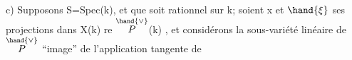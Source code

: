 c) Supposons S=Spec(k), et que  \inserted{$\in$} soit rationnel sur k; soient x
et $\hand{\xi}$ ses projections dans X(k) re $\overset{\hand{\vee}}{P}$(k) , et considérons la 
sous-variété linéaire  de $\overset{\hand{\vee}}{P}$ ``image'' de l'application tangente de

